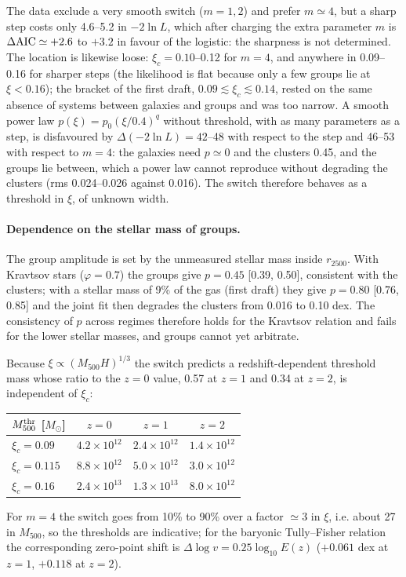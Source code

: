 \documentclass[11pt,a4paper]{article}
\newcommand{\Msun}{M_\odot}
\begin{document}
The data exclude a very smooth switch ($m=1,2$) and prefer $m\simeq4$, but a sharp step costs only 4.6--5.2 in $-2\ln L$, which after charging the extra parameter $m$ is $\Delta{\rm AIC}\simeq+2.6$ to $+3.2$ in favour of the logistic: the sharpness is not determined. The location is likewise loose: $\xi_c=0.10$--0.12 for $m=4$, and anywhere in 0.09--0.16 for sharper steps (the likelihood is flat because only a few groups lie at $\xi<0.16$); the bracket of the first draft, $0.09\lesssim\xi_c\lesssim0.14$, rested on the same absence of systems between galaxies and groups and was too narrow. A smooth power law $p(\xi)=p_0(\xi/0.4)^q$ without threshold, with as many parameters as a step, is disfavoured by $\Delta(-2\ln L)=42$--48 with respect to the step and 46--53 with respect to $m=4$: the galaxies need $p\simeq0$ and the clusters 0.45, and the groups lie between, which a power law cannot reproduce without degrading the clusters (rms 0.024--0.026 against 0.016). The switch therefore behaves as a threshold in $\xi$, of unknown width.

\paragraph{Dependence on the stellar mass of groups.} The group amplitude is set by the unmeasured stellar mass inside $r_{2500}$. With Kravtsov stars ($\varphi=0.7$) the groups give $p=0.45$ [0.39, 0.50], consistent with the clusters; with a stellar mass of 9\% of the gas (first draft) they give $p=0.80$ [0.76, 0.85] and the joint fit then degrades the clusters from 0.016 to 0.10 dex. The consistency of $p$ across regimes therefore holds for the Kravtsov relation and fails for the lower stellar masses, and groups cannot yet arbitrate.

Because $\xi\propto(M_{500}H)^{1/3}$ the switch predicts a redshift-dependent threshold mass whose ratio to the $z=0$ value, 0.57 at $z=1$ and 0.34 at $z=2$, is independent of $\xi_c$:
\begin{center}\small
\begin{tabular}{lccc}
\toprule
$M_{500}^{\rm thr}$ [$\Msun$] & $z=0$ & $z=1$ & $z=2$ \\
\midrule
$\xi_c=0.09$ & $4.2\times10^{12}$ & $2.4\times10^{12}$ & $1.4\times10^{12}$ \\
$\xi_c=0.115$ & $8.8\times10^{12}$ & $5.0\times10^{12}$ & $3.0\times10^{12}$ \\
$\xi_c=0.16$ & $2.4\times10^{13}$ & $1.3\times10^{13}$ & $8.0\times10^{12}$ \\
\bottomrule
\end{tabular}
\end{center}
For $m=4$ the switch goes from 10\% to 90\% over a factor $\simeq3$ in $\xi$, i.e. about 27 in $M_{500}$, so the thresholds are indicative; for the baryonic Tully--Fisher relation the corresponding zero-point shift is $\Delta\log v=0.25\log_{10}E(z)$ ($+0.061$ dex at $z=1$, $+0.118$ at $z=2$).
\end{document}
